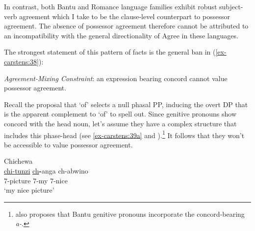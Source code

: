 \documentclass[output=paper
,modfonts
,nonflat]{langsci/langscibook}
\begin{document}
\begin{exe} \settowidth{}
\ex\label{ex-carstens:37} \xlist
{}
\endxlist
\end{exe}
In contrast, both Bantu and Romance language families exhibit robust subject-verb agreement which I take to be the clause-level counterpart to possessor agreement. The absence of possessor agreement therefore cannot be attributed to an incompatibility with the general directionality of Agree in these languages. 

The strongest statement of this pattern of facts is the general ban in (\ref{ex-carstens:38}): 

\begin{exe}
\ex\label{ex-carstens:38} \textit{Agreement-Mixing Constraint}: an expression bearing concord cannot value possessor agreement.
\end{exe}
Recall the proposal that `of' selects a null phasal PP, inducing the overt DP that is the apparent complement to ‘of’ to spell out. Since genitive pronouns show concord with the head noun, let’s assume they have a complex structure that includes this phase-head (see \ref{ex-carstens:39a} and ).\footnote{\citet{Spencer2007} also proposes that Bantu genitive pronouns incorporate the concord-bearing \textit{a-}.} It follows that they won't be accessible to value possessor agreement. 

\begin{exe}
\ex Chichewa\\\label{ex-carstens:39}\label{ex-carstens:39a}
\gll \uline{chi}\uline{-tunzi}     \uline{ch}\textbf{-}anga   ch-abwino\\
7-picture   7-my       7-nice\\
\glt `my nice picture'
\end{exe}
\end{document}
